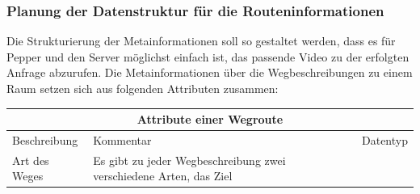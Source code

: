 \subsubsection{Planung der Datenstruktur für die Routeninformationen}

Die Strukturierung der Metainformationen soll so gestaltet werden, dass es für Pepper und den Server möglichst einfach ist, das passende Video zu der erfolgten Anfrage abzurufen. Die Metainformationen über die Wegbeschreibungen zu einem Raum setzen sich aus folgenden Attributen zusammen:\vspace{5mm}

\begin{tabular}{| l | p{9.45cm} | c| } \hline
    \multicolumn{3}{|c|}{\textbf{Attribute einer Wegroute}}                                                                                                                                                                                                                                                                                                                                                                                                                                                                                                                                                                                                                                                                                                                                                                                                                         \\ \hline\hline
    Beschreibung                                                                                                                                                                                                                                                                                                                                                                                                                                                                                                                                                    & Kommentar                                                                                                                                                                                                                                                                                          & Datentyp \\
    \hline
    Art des Weges                                                                                                                                                                                                                                                                                                                                                                                                                                                                                                                                                   & \small Es gibt zu jeder Wegbeschreibung zwei verschiedene Arten, das Ziel

\end{tabular}
